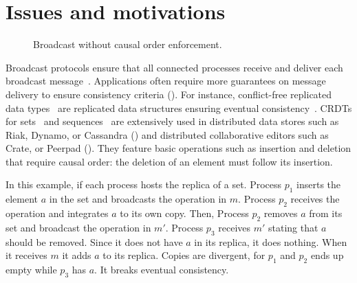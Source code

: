 
\section{Issues and motivations}
\label{sec:motivations}

\begin{figure}
  \begin{center}
  
  \caption{\label{fig:generalproblem}Broadcast without causal order
    enforcement.}
  \end{center}
\end{figure}



Broadcast protocols ensure that all connected processes receive and deliver each
broadcast message~\cite{hadzilacos1994modular}. Applications often require more
guarantees on message delivery to ensure consistency criteria (\REF). For
instance, conflict-free replicated data types~\cite{shapiro2011comprehensive}
are replicated data structures ensuring eventual
consistency~\cite{bailis2013eventual}. CRDTs for sets~\cite{mukund2014optimized}
and sequences~\cite{weiss2009logoot} are extensively used in distributed data
stores such as Riak, Dynamo, or Cassandra (\REF) and distributed collaborative
editors such as Crate, or Peerpad (\REF). They feature basic operations such as
insertion and deletion that require causal order: the deletion of an element
must follow its insertion.


In this example, if each process hosts the replica of a set. Process $p_1$
inserts the element $a$ in the set and broadcasts the operation in $m$. Process
$p_2$ receives the operation and integrates $a$ to its own copy. Then, Process
$p_2$ removes $a$ from its set and broadcast the operation in $m'$. Process
$p_3$ receives $m'$ stating that $a$ should be removed. Since it does not have
$a$ in its replica, it does nothing. When it receives $m$ it adds $a$ to its
replica. Copies are divergent, for $p_1$ and $p_2$ ends up empty while $p_3$ has
$a$. It breaks eventual consistency.

